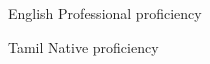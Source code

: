 
\begin{cvskills}

  \cvskill
    {English} %
    {Professional proficiency} %

  \cvskill
    {Tamil} %
    {Native proficiency} %

\end{cvskills}
